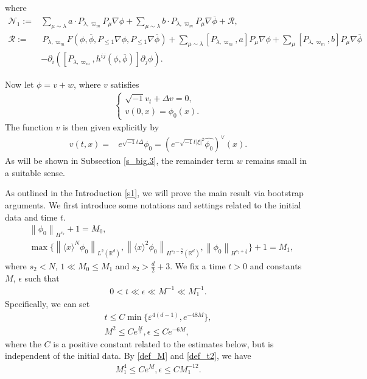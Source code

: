 \documentclass[10pt,twoside,a4paper]{article}
\numberwithin{equation}{section}\allowdisplaybreaks
\def\leq{\leqslant}
\begin{document}
where 
\begin{align}
	\mathcal{N}_1:=&\sum_{\mu\sim \lambda} a \cdot  P_{\lambda, \varpi_m}   P_\mu \nabla \phi + \sum_{\mu\sim \lambda} b\cdot  P_{\lambda, \varpi_m}   P_\mu \nabla\overline{ \phi }+\mathcal{R}, \\
	\mathcal{R}:=& \,P_{\lambda, \varpi_m}  F(\phi, \overline{\phi}, P_{\leq 1} \nabla \phi,  P_{\leq 1} \nabla \overline{\phi}) + \sum_{\mu\sim \lambda} [  P_{\lambda, \varpi_m},a  ]  P_\mu \nabla \phi + \sum_{\mu}  [P_{\lambda, \varpi_m},b ]  P_\mu \nabla\overline{ \phi } \nonumber\\
	&-\partial_i\left(\left[P_{\lambda, \varpi_m}, h^{ij}\left(\phi,\overline{\phi}\right) \right]  \partial_j  \phi \right).  \label{remainderterm}
\end{align}






Now let $ \phi=v+w $, where $ v $ satisfies   
\begin{align} \label{eq_v}
	\begin{cases}	\sqrt{-1}v_t+\Delta  v=0,\\
		v(0,x)=\phi_0(x).
	\end{cases}
\end{align}
The function  $v$ is then given explicitly by
\begin{align} \label{sol_v}
	v(t,x)=& e^{\sqrt{-1} t \Delta }    \phi_0=\left(e^{- 	\sqrt{-1} t |\xi|^2 } \widehat{   \phi_0}\right)^{\vee}(x).
\end{align}
As will be shown in Subsection \ref{s_big.3}, the remainder term  $w$ remains small in a suitable sense.

As outlined in the Introduction \ref{s1}, we will prove the main result via bootstrap arguments. We first introduce some notations and settings related to the initial data and time $t$.
\begin{align}
	&  \left\| \phi_0\right\|_{H^{s_2}} +1 = M_0, \label{ini1}\\
	&   \max\{\left\| \langle x\rangle^{N}\phi_0  \right\|_{L^{2}(\mathbb{R}^d)}, \left\| \langle x\rangle^2 \phi_0  \right\|_{H^{s_2-\frac 32}(\mathbb{R}^d)},\left\| \phi_0\right\|_{H^{s_2+\frac 12}} \}+1= M_1, \label{ini2}
\end{align}
where $ s_2< N $, $ 1\ll M_0 \leq M_1  $ and $ s_2 >\frac{d}{2}+3 $.
We fix a time $t > 0$ and constants $M$, $\epsilon$ such that
\begin{align}
	0<	t\ll \epsilon \ll M^{-1} \ll M_1^{-1}. \label{def_M}
\end{align}
Specifically, we can set
\begin{align}
	 t \leq C \min \{\varepsilon^{4(d-1)}, 
 e^{-48M}\},\label{def_t1}\\
 M^2\leq  Ce^{\frac M2}, \epsilon \leq Ce^{-6M},\label{def_t2}
\end{align}
where  the $ C $ is a positive constant  related to the estimates below, but is independent of the initial data. By \eqref{def_M} and \eqref{def_t2}, we have
\begin{align*}
     M_1^4\leq C e^M, \epsilon \leq CM_1^{-12}.
\end{align*}
\end{document}
